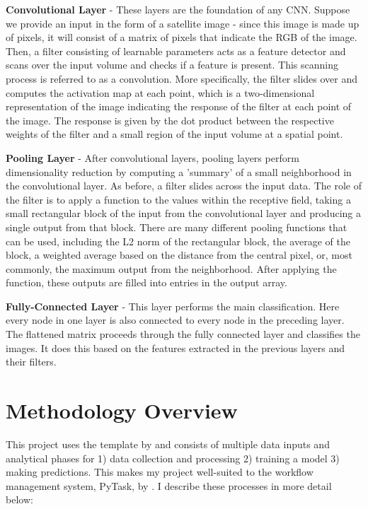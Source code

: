 \documentclass[11pt, a4paper, leqno]{article}
\begin{document}
\textbf{Convolutional Layer} - These layers are the foundation of any CNN. Suppose we provide an input in the form of a satellite image - since this image is made up of pixels, it will consist of a matrix of pixels that indicate the RGB of the image. Then, a filter consisting of learnable parameters acts as a feature detector and scans over the input volume and checks if a feature is present. This scanning process is referred to as a convolution. More specifically, the filter slides over and computes the activation map at each point, which is a two-dimensional representation of the image indicating the response of the filter at each point of the image. The response is given by the dot product between the respective weights of the filter and a small region of the input volume at a spatial point. 

\textbf{Pooling Layer} - After convolutional layers, pooling layers perform dimensionality reduction by computing a 'summary' of a small neighborhood in the convolutional layer. As before, a filter slides across the input data. The role of the filter is to apply a function to the values within the receptive field, taking a small rectangular block of the input from the convolutional layer and producing a single output from that block. There are many different pooling functions that can be used, including the L2 norm of the rectangular block, the average of the block, a weighted average based on the distance from the central pixel, or, most commonly, the maximum output from the neighborhood. After applying the function, these outputs are filled into entries in the output array. 

\textbf{Fully-Connected Layer} - This layer performs the main classification. Here every node in one layer is also connected to every node in the preceding layer. The flattened matrix proceeds through the fully connected layer and classifies the images. It does this based on the features extracted in the previous layers and their filters.

\section{Methodology Overview} 
 This project uses the template by \citet{GaudeckerEconProjectTemplates} and consists of multiple data inputs and analytical phases for 1) data collection and processing 2) training a model 3) making predictions. This makes my project well-suited to the workflow management system, PyTask, by \citet{Raabe2020}. I describe these processes in more detail below:
\end{document}
